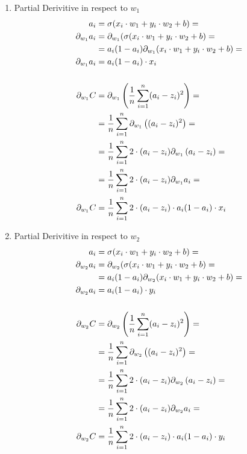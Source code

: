 \documentclass{article}
\begin{document}
\begin{enumerate}
    \item{
        Partial Derivitive in respect to $w_1$
        \begin{align}
            a_i  &= \sigma(x_i \cdot w_1 + y_i \cdot w_2 + b) = \\ 
            \pd[w_1]a_i  &= \pd[w_1](\sigma(x_i \cdot w_1 + y_i \cdot w_2 + b) = \\ 
                         &= a_i(1 - a_i) \pd[w_1](x_i \cdot w_1 + y_i \cdot w_2 +b) = \\ 
            \pd[w_1]a_i  &= a_i(1 - a_i) \cdot x_i \\ 
            \\
            \pd[w_1]C &=\pd[w_1]\left(\avgsum[i, n](a_i - z_i)^2\right) =  \\ 
                    &=\avgsum[i, n]\pd[w_1]\left((a_i - z_i)^2\right) =  \\ 
                    &=\avgsum[i, n]2 \cdot (a_i - z_i)\pd[w_1]\left(a_i - z_i\right) = \\ 
                    &=\avgsum[i, n]2 \cdot (a_i - z_i)\pd[w_1]a_i = \\ 
            \pd[w_1]C &=\avgsum[i, n]2 \cdot (a_i - z_i) \cdot a_i(1 - a_i) \cdot x_i \\ 
        \end{align}
    }
    \item{
        Partial Derivitive in respect to $w_2$
        \begin{align}
            a_i  &= \sigma(x_i \cdot w_1 + y_i \cdot w_2 + b) = \\ 
            \pd[w_2]a_i  &= \pd[w_2](\sigma(x_i \cdot w_1 + y_i \cdot w_2 + b) = \\ 
                         &= a_i(1 - a_i) \pd[w_2](x_i \cdot w_1 + y_i \cdot w_2 +b) = \\ 
            \pd[w_2]a_i  &= a_i(1 - a_i) \cdot y_i \\ 
            \\
            \pd[w_2]C &=\pd[w_2]\left(\avgsum[i, n](a_i - z_i)^2\right) =  \\ 
                    &=\avgsum[i, n]\pd[w_2]\left((a_i - z_i)^2\right) =  \\ 
                    &=\avgsum[i, n]2 \cdot (a_i - z_i)\pd[w_2]\left(a_i - z_i\right) = \\ 
                    &=\avgsum[i, n]2 \cdot (a_i - z_i)\pd[w_2]a_i = \\ 
            \pd[w_2]C &=\avgsum[i, n]2 \cdot (a_i - z_i) \cdot a_i(1 - a_i) \cdot y_i \\ 

\end{align}}
\end{enumerate}
\end{document}
